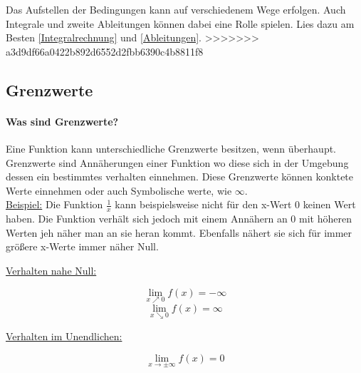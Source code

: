 \documentclass{article}
\begin{document}
Das Aufstellen der Bedingungen kann auf verschiedenem Wege erfolgen. Auch Integrale und zweite Ableitungen können dabei eine Rolle spielen.
Lies dazu am Besten \ref{Integralrechnung} und \ref{Ableitungen}.
>>>>>>> a3d9df66a0422b892d6552d2fbb6390c4b8811f8

	\subsection{Grenzwerte}
		\paragraph{Was sind Grenzwerte?} \label{Definitionsbereich}
			Eine Funktion kann unterschiedliche Grenzwerte besitzen, wenn überhaupt. Grenzwerte sind Annäherungen einer Funktion wo diese sich in der Umgebung dessen ein bestimmtes verhalten einnehmen. Diese Grenzwerte können konktete Werte einnehmen oder auch Symbolische werte, wie $\infty$. \\
			\underline{Beispiel:} Die Funktion $ \frac {1} {x}$ kann beispielsweise nicht für den x-Wert $0$ keinen Wert haben. Die Funktion verhält sich jedoch mit einem Annähern an $0$ mit höheren Werten jeh näher man an sie heran kommt. Ebenfalls nähert sie sich für immer größere x-Werte immer näher Null.
			
		\begin{multicols}{2}
		
		
		\underline{Verhalten nahe Null:}
		
		\[\lim\limits_{x \nearrow 0} f(x) = - \infty\]
		\[\lim\limits_{x \searrow 0} f(x) =  \infty\]
		
		\underline{Verhalten im Unendlichen:}
		
		\[\lim\limits_{x \rightarrow \pm \infty} f(x) = 0\]
		
		\end{multicols}
				
\end{document}
